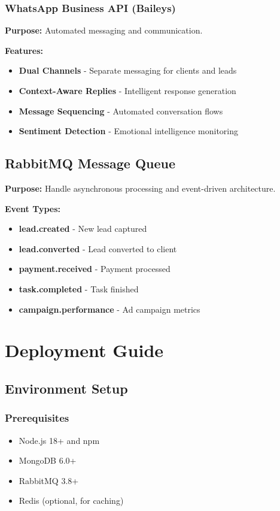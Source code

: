 \documentclass[12pt,a4paper]{article}
\begin{document}
\subsubsection{WhatsApp Business API (Baileys)}
\textbf{Purpose:} Automated messaging and communication.

\textbf{Features:}
\begin{itemize}
    \item \textbf{Dual Channels} - Separate messaging for clients and leads
    \item \textbf{Context-Aware Replies} - Intelligent response generation
    \item \textbf{Message Sequencing} - Automated conversation flows
    \item \textbf{Sentiment Detection} - Emotional intelligence monitoring
\end{itemize}

\subsection{RabbitMQ Message Queue}
\textbf{Purpose:} Handle asynchronous processing and event-driven architecture.

\textbf{Event Types:}
\begin{itemize}
    \item \textbf{lead.created} - New lead captured
    \item \textbf{lead.converted} - Lead converted to client
    \item \textbf{payment.received} - Payment processed
    \item \textbf{task.completed} - Task finished
    \item \textbf{campaign.performance} - Ad campaign metrics
\end{itemize}

\section{Deployment Guide}

\subsection{Environment Setup}

\subsubsection{Prerequisites}
\begin{itemize}
    \item Node.js 18+ and npm
    \item MongoDB 6.0+
    \item RabbitMQ 3.8+
    \item Redis (optional, for caching)
\end{itemize}
\end{document}
